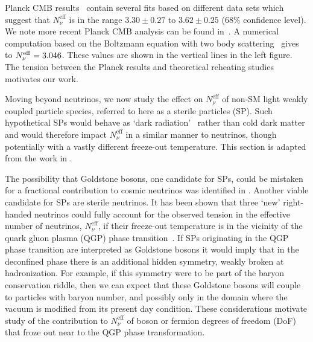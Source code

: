  
Planck CMB results~\cite{Planck:2013pxb}  contain several fits based on different data sets which suggest that $N^{\mathrm{eff}}_\nu$ is in the range $3.30\pm 0.27$ to $3.62\pm0.25$ ($68\%$ confidence level). We note more recent Planck CMB analysis can be found in~\cite{Planck:2018vyg}. A numerical computation based on the Boltzmann equation with two body scattering~\cite{Mangano:2005cc} gives to $N_{\nu}^{\rm eff}=3.046$. These values are shown in the vertical lines in the left figure. The tension between the Planck results and theoretical reheating studies motivates our work.

Moving beyond neutrinos, we now study the effect on $N_\nu^{\text{eff}}$ of non-SM light weakly coupled  particle species, referred to here as a sterile particles (SP). Such hypothetical SPs would behave as `dark radiation'~\cite{Steigman:2013yua} rather than cold dark matter and would therefore impact $N_\nu^{\text{eff}}$ in a similar manner to neutrinos, though potentially with a vastly different freeze-out temperature.  This section is adapted from the work in \cite{Birrell:2014cja}.


The possibility that Goldstone bosons, one candidate for SPs,  could be mistaken for a fractional contribution to cosmic neutrinos was  identified in \cite{Weinberg:2013kea}.  Another viable candidate for SPs are sterile neutrinos. It has been shown that  three `new' right-handed neutrinos could fully account for the observed tension in the effective number of neutrinos, $N^{\text{eff}}_{\nu}$, if their freeze-out temperature    is in the vicinity of the quark gluon plasma (QGP) phase transition~\cite{Anchordoqui:2011nh,Anchordoqui:2012qu}.  If SPs originating in the QGP phase transition are interpreted as Goldstone bosons it would imply that in the deconfined phase there is  an additional hidden symmetry, weakly broken at hadronization.  For example, if this symmetry were to be part of the baryon conservation riddle, then we can expect that these Goldstone bosons will  couple to particles with baryon number, and possibly only in the domain where the vacuum is modified from its present day condition.  These considerations motivate  study of the contribution to 
$N^{\text{eff}}_{\nu}$ of boson or fermion degrees of freedom (DoF) that froze out near to the QGP phase transformation. 

